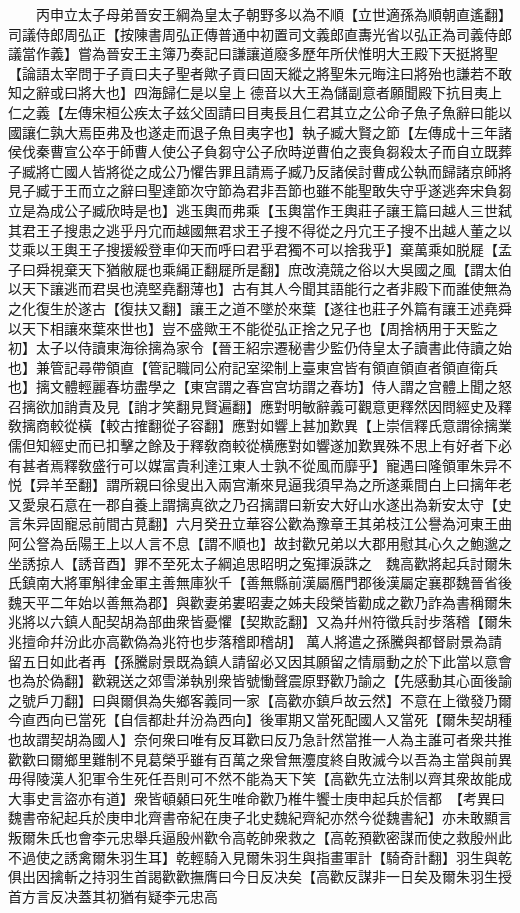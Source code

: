 　　丙申立太子母弟晉安王綱為皇太子朝野多以為不順【立世適孫為順朝直遙翻】司議侍郎周弘正【按陳書周弘正傳普通中初置司文義郎直夀光省以弘正為司義侍郎議當作義】嘗為晉安王主簿乃奏記曰謙讓道廢多歷年所伏惟明大王殿下天挺將聖【論語太宰問于子貢曰夫子聖者歟子貢曰固天縱之將聖朱元晦注曰將殆也謙若不敢知之辭或曰將大也】四海歸仁是以皇上德音以大王為儲副意者願聞殿下抗目夷上仁之義【左傳宋桓公疾太子兹父固請曰目夷長且仁君其立之公命子魚子魚辭曰能以國讓仁孰大焉臣弗及也遂走而退子魚目夷字也】執子臧大賢之節【左傳成十三年諸侯伐秦曹宣公卒于師曹人使公子負芻守公子欣時逆曹伯之喪負芻殺太子而自立既葬子臧將亡國人皆將從之成公乃懼告罪且請焉子臧乃反諸侯討曹成公執而歸諸京師將見子臧于王而立之辭曰聖達節次守節為君非吾節也雖不能聖敢失守乎遂逃奔宋負芻立是為成公子臧欣時是也】逃玉輿而弗乘【玉輿當作王輿莊子讓王篇曰越人三世弑其君王子搜患之逃乎丹宂而越國無君求王子搜不得從之丹宂王子搜不出越人董之以艾乘以王輿王子搜援綏登車仰天而呼曰君乎君獨不可以捨我乎】棄萬乘如脱屣【孟子曰舜視棄天下猶敝屣也乘䋲正翻屣所是翻】庶改澆競之俗以大吳國之風【謂太伯以天下讓逃而君吳也澆堅堯翻薄也】古有其人今聞其語能行之者非殿下而誰使無為之化復生於遂古【復扶又翻】讓王之道不墜於來葉【遂往也莊子外篇有讓王述堯舜以天下相讓來葉來世也】豈不盛歟王不能從弘正捨之兄子也【周捨柄用于天監之初】太子以侍讀東海徐摛為家令【晉王紹宗遷秘書少監仍侍皇太子讀書此侍讀之始也】兼管記尋帶領直【管記職同公府記室梁制上臺東宫皆有領直領直者領直衛兵也】摛文體輕麗春坊盡學之【東宫謂之春宫宫坊謂之春坊】侍人謂之宫體上聞之怒召摛欲加誚責及見【誚才笑翻見賢遍翻】應對明敏辭義可觀意更釋然因問經史及釋敎摛商較從橫【較古搉翻從子容翻】應對如響上甚加歎異【上崇信釋氏意謂徐摛業儒但知經史而已扣擊之餘及于釋敎商較從横應對如響遂加歎異殊不思上有好者下必有甚者焉釋敎盛行可以媒富貴利達江東人士孰不從風而靡乎】寵遇曰隆領軍朱异不悦【异羊至翻】謂所親曰徐叟出入兩宫漸來見逼我須早為之所遂乘間白上曰摛年老又愛泉石意在一郡自養上謂摛真欲之乃召摛謂曰新安大好山水遂出為新安太守【史言朱异固寵忌前間古莧翻】六月癸丑立華容公歡為豫章王其弟枝江公譽為河東王曲阿公詧為岳陽王上以人言不息【謂不順也】故封歡兄弟以大郡用慰其心久之鮑邈之坐誘掠人【誘音酉】罪不至死太子綱追思眧明之寃揮淚誅之　魏高歡將起兵討爾朱氏鎮南大將軍斛律金軍主善無庫狄千【善無縣前漢屬鴈門郡後漢屬定襄郡魏晉省後魏天平二年始以善無為郡】與歡妻弟婁昭妻之姊夫段榮皆勸成之歡乃詐為書稱爾朱兆將以六鎮人配契胡為部曲衆皆憂懼【契欺訖翻】又為幷州符徵兵討步落稽【爾朱兆擅命幷汾此亦高歡偽為兆符也步落稽即稽胡】萬人將遣之孫騰與都督尉景為請留五日如此者再【孫騰尉景既為鎮人請留必又因其願留之情扇動之於下此當以意會也為於偽翻】歡親送之郊雪涕執别衆皆號慟聲震原野歡乃諭之【先感動其心面後諭之號戶刀翻】曰與爾俱為失鄉客義同一家【高歡亦鎮戶故云然】不意在上徵發乃爾今直西向已當死【自信都赴幷汾為西向】後軍期又當死配國人又當死【爾朱契胡種也故謂契胡為國人】奈何衆曰唯有反耳歡曰反乃急計然當推一人為主誰可者衆共推歡歡曰爾鄉里難制不見葛榮乎雖有百萬之衆曾無灋度終自敗滅今以吾為主當與前異毋得陵漢人犯軍令生死任吾則可不然不能為天下笑【高歡先立法制以齊其衆故能成大事史言盜亦有道】衆皆頓顙曰死生唯命歡乃椎牛饗士庚申起兵於信都　【考異曰魏書帝紀起兵於庚申北齊書帝紀在庚子北史魏紀齊紀亦然今從魏書紀】亦未敢顯言叛爾朱氏也會李元忠舉兵逼殷州歡令高乾帥衆救之【高乾預歡密謀而使之救殷州此不過使之誘禽爾朱羽生耳】乾輕騎入見爾朱羽生與指畫軍計【騎奇計翻】羽生與乾俱出因擒斬之持羽生首謁歡歡撫膺曰今日反决矣【高歡反謀非一日矣及爾朱羽生授首方言反决蓋其初猶有疑李元忠高